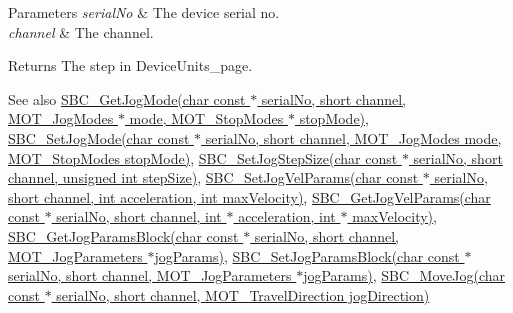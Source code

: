 \begin{DoxyParams}{Parameters}
{\em serial\+No} & The device serial no. \\
\hline
{\em channel} & The channel. \\
\hline
\end{DoxyParams}
\begin{DoxyReturn}{Returns}
The step in Device\+Units\+\_\+page. 
\end{DoxyReturn}
\begin{DoxySeeAlso}{See also}
\hyperlink{group___benchtop_stepper_gab1c4fac9ad4f68c1d95d739c8d7c16ef}{S\+B\+C\+\_\+\+Get\+Jog\+Mode(char const $\ast$ serial\+No, short channel, M\+O\+T\+\_\+\+Jog\+Modes $\ast$ mode, M\+O\+T\+\_\+\+Stop\+Modes $\ast$ stop\+Mode)}, \hyperlink{group___benchtop_stepper_ga6667f906dbacd21f4a575fe2a32abfa8}{S\+B\+C\+\_\+\+Set\+Jog\+Mode(char const $\ast$ serial\+No, short channel, M\+O\+T\+\_\+\+Jog\+Modes mode, M\+O\+T\+\_\+\+Stop\+Modes stop\+Mode)}, \hyperlink{group___benchtop_stepper_ga65817f5690ee50828f4f57668bd8a8a1}{S\+B\+C\+\_\+\+Set\+Jog\+Step\+Size(char const $\ast$ serial\+No, short channel, unsigned int step\+Size)}, \hyperlink{group___benchtop_stepper_ga9b42d967a9f6edb7b6d2c74f505f93fa}{S\+B\+C\+\_\+\+Set\+Jog\+Vel\+Params(char const $\ast$ serial\+No, short channel, int acceleration, int max\+Velocity)}, \hyperlink{group___benchtop_stepper_ga2f934f78b52b7afc79247f93843c353a}{S\+B\+C\+\_\+\+Get\+Jog\+Vel\+Params(char const $\ast$ serial\+No, short channel, int $\ast$ acceleration, int $\ast$ max\+Velocity)}, \hyperlink{group___benchtop_stepper_ga8d81772a8897fb068231b62bb7c2de57}{S\+B\+C\+\_\+\+Get\+Jog\+Params\+Block(char const $\ast$ serial\+No, short channel, M\+O\+T\+\_\+\+Jog\+Parameters $\ast$jog\+Params)}, \hyperlink{group___benchtop_stepper_gac1360dcf893d925107ab529a6bf224b2}{S\+B\+C\+\_\+\+Set\+Jog\+Params\+Block(char const $\ast$ serial\+No, short channel, M\+O\+T\+\_\+\+Jog\+Parameters $\ast$jog\+Params)}, \hyperlink{group___benchtop_stepper_ga6b72236d9e1b746a0d3359de5c769e85}{S\+B\+C\+\_\+\+Move\+Jog(char const $\ast$ serial\+No, short channel, M\+O\+T\+\_\+\+Travel\+Direction jog\+Direction)}


\end{DoxySeeAlso}

\begin{DoxyCodeInclude}
\end{DoxyCodeInclude}
